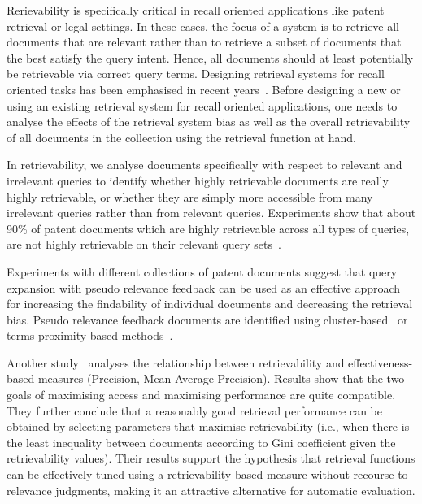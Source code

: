 Rerievability is specifically critical in recall oriented applications like patent retrieval or legal settings. In these cases, the focus of a system is to retrieve all documents that are relevant rather than to retrieve a subset of documents that the best satisfy the query intent.
Hence, all documents should at least potentially be retrievable via correct query terms. Designing retrieval systems for recall oriented tasks has been emphasised in recent years~\citep{fujii2007introduction, kontostathis2008effect}. Before designing a new or using an existing retrieval system for recall oriented applications, one needs to analyse the effects of the retrieval system bias as well as the overall retrievability of all documents in the collection using the retrieval function at hand.

In retrievability, we analyse documents specifically with respect to relevant and irrelevant queries to identify whether highly retrievable documents are really highly retrievable, or whether they are simply more accessible from many irrelevant queries rather than from relevant queries. Experiments show that about 90\% of patent documents which are highly retrievable across all types of queries, are not highly retrievable on their relevant query sets~\citep{bashir2009analyzing}.

Experiments with different collections of patent documents suggest that query expansion with pseudo relevance feedback can be used as an effective approach for increasing the findability of individual documents and decreasing the retrieval bias. Pseudo relevance feedback documents are identified using cluster-based~\citep{bashir2009improving} or terms-proximity-based methods~\citep{bashir2010improving}.

Another study~\citep{bache2010improving} analyses the relationship between retrievability and effectiveness-based measures (Precision, Mean Average Precision). Results show that the two goals of maximising access and maximising performance are quite compatible. They further conclude that a reasonably good retrieval performance can be obtained by selecting parameters that maximise retrievability (i.e., when there is the least inequality between documents according to Gini coefficient given the retrievability values). Their results support the hypothesis that retrieval functions can be effectively tuned using a retrievability-based measure without recourse to relevance judgments, making it an attractive alternative for automatic evaluation.
